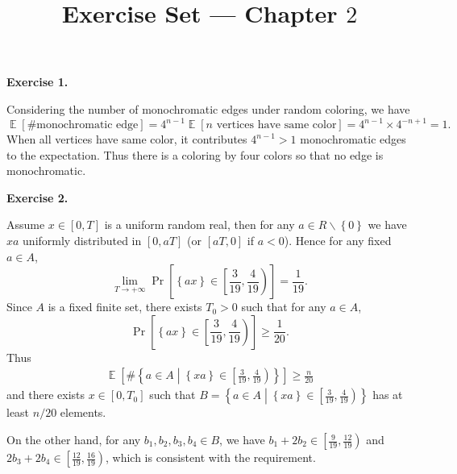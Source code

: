 \documentclass[a4paper]{article}
\title{Exercise Set --- Chapter $2$}
\date{}
\newenvironment{exercise}[1]{
	\par
	\noindent\textbf{Exercise #1.}\quad
}{
	\par
	\bigskip
}
\DeclareMathOperator{\E}{\mathbb E}
\newcommand{\cbra}[1]{\left\{ #1 \right\}}
\newcommand{\sbra}[1]{\left[ #1 \right]}
\begin{document}
\maketitle

\begin{exercise}{1}
    Considering the number of monochromatic edges under random coloring, we have
    $$
    \E\sbra{\#\text{monochromatic edge}}=4^{n-1}\E\sbra{n\text{ vertices have same color}}=4^{n-1}\times4^{-n+1}=1.
    $$
    When all vertices have same color, it contributes $4^{n-1}>1$ monochromatic edges to the expectation. 
    Thus there is a coloring by four colors so that no edge is monochromatic.
\end{exercise}

\begin{exercise}{2}
    Assume $x\in[0,T]$ is a uniform random real, 
    then for any $a\in R\backslash\cbra{0}$ we have $xa$ uniformly distributed in $[0,aT]$ (or $[aT,0]$ if $a<0$).
    Hence for any fixed $a\in A$, 
    $$
    \lim_{T\to+\infty}\Pr\sbra{\cbra{ax}\in\left[\frac3{19},\frac4{19}\right)}=\frac1{19}.
    $$
    Since $A$ is a fixed finite set, there exists $T_0>0$ such that for any $a\in A$,
    $$
    \Pr\sbra{\cbra{ax}\in\left[\frac3{19},\frac4{19}\right)}\geq\frac1{20}.
    $$
    Thus
    \begin{align*}
        \E\sbra{\#\cbra{a\in A\middle|\cbra{xa}\in\left[\frac3{19},\frac4{19}\right)}}\geq\frac n{20}
    \end{align*}
    and there exists $x\in[0,T_0]$ such that $B=\cbra{a\in A\middle|\cbra{xa}\in\left[\frac3{19},\frac4{19}\right)}$
    has at least $n/20$ elements.

    On the other hand, for any $b_1,b_2,b_3,b_4\in B$, we have $b_1+2b_2\in\left[\frac9{19},\frac{12}{19}\right)$ and
    $2b_3+2b_4\in\left[\frac{12}{19},\frac{16}{19}\right)$, which is consistent with the requirement.
\end{exercise}
\end{document}
